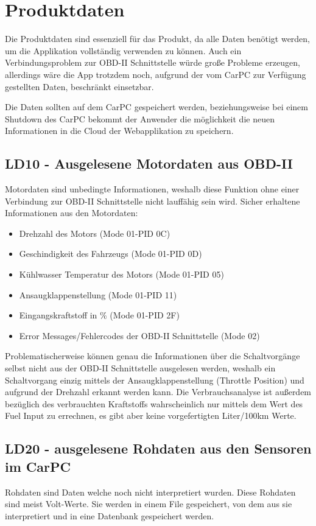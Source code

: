 \chapter{Produktdaten}

Die Produktdaten sind essenziell für das Produkt, da alle Daten benötigt werden, um die Applikation vollständig verwenden zu können. Auch ein Verbindungsproblem zur OBD-II Schnittstelle würde große Probleme erzeugen, allerdings wäre die App trotzdem noch, aufgrund der vom CarPC zur Verfügung gestellten Daten, beschränkt einsetzbar.

Die Daten sollten auf dem CarPC gespeichert werden, beziehungsweise bei einem Shutdown des CarPC bekommt der Anwender die möglichkeit die neuen Informationen in die Cloud der Webapplikation zu speichern.

\section{LD10 - Ausgelesene Motordaten aus OBD-II}
Motordaten sind unbedingte Informationen, weshalb diese Funktion ohne einer Verbindung zur OBD-II Schnittstelle nicht lauffähig sein wird.
Sicher erhaltene Informationen aus den Motordaten:
\begin{itemize}
	\item Drehzahl des Motors (Mode 01-PID 0C)
	\item Geschindigkeit des Fahrzeugs (Mode 01-PID 0D)
	\item Kühlwasser Temperatur des Motors (Mode 01-PID 05)
	\item Ansaugklappenstellung (Mode 01-PID 11)
	\item Eingangskraftstoff in \% (Mode 01-PID 2F)
	\item Error Messages/Fehlercodes der OBD-II Schnittstelle (Mode 02)
\end{itemize}
\newpage
Problematischerweise können genau die Informationen über die Schaltvorgänge selbst nicht aus der OBD-II Schnittstelle ausgelesen werden, weshalb ein Schaltvorgang einzig mittels der Ansaugklappenstellung (Throttle Position) und aufgrund der Drehzahl erkannt werden kann.
Die Verbrauchsanalyse ist außerdem bezüglich des verbrauchten Kraftstoffs wahrscheinlich nur mittels dem Wert des Fuel Input zu errechnen, es gibt aber keine vorgefertigten Liter/100km Werte.

\section{LD20 - ausgelesene Rohdaten aus den Sensoren im CarPC}
Rohdaten sind Daten welche noch nicht interpretiert wurden. Diese Rohdaten sind meist Volt-Werte. Sie werden in einem File gespeichert, von dem aus sie interpretiert und in eine Datenbank gespeichert werden.

